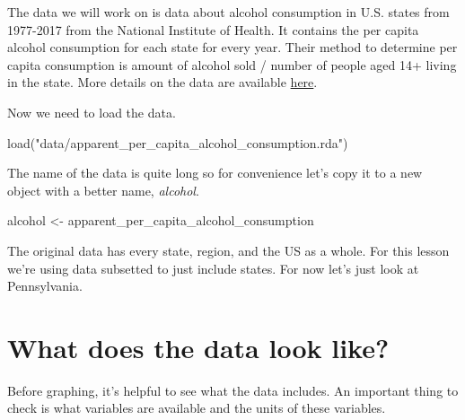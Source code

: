 \documentclass[
  12pt,
]{book}
\newenvironment{Shaded}{\begin{snugshade}}{\end{snugshade}}
\newcommand{\FunctionTok}[1]{\textcolor[rgb]{0,0,0}{#1}}
\newcommand{\NormalTok}[1]{#1}
\newcommand{\OtherTok}[1]{\textcolor[rgb]{0.37,0.37,0.37}{#1}}
\newcommand{\SpecialCharTok}[1]{\textcolor[rgb]{0,0,0}{#1}}
\newcommand{\StringTok}[1]{\textcolor[rgb]{0.5,0.5,0.5}{#1}}
\begin{document}
The data we will work on is data about alcohol consumption in U.S. states from 1977-2017 from the National Institute of Health. It contains the per capita alcohol consumption for each state for every year. Their method to determine per capita consumption is amount of alcohol sold / number of people aged 14+ living in the state. More details on the data are available \href{https://www.openicpsr.org/openicpsr/project/105583/version/V2/view}{here}.

Now we need to load the data.

\begin{Shaded}
\begin{Highlighting}[]
\FunctionTok{load}\NormalTok{(}\StringTok{"data/apparent\_per\_capita\_alcohol\_consumption.rda"}\NormalTok{)}
\end{Highlighting}
\end{Shaded}

The name of the data is quite long so for convenience let's copy it to a new object with a better name, \emph{alcohol}.

\begin{Shaded}
\begin{Highlighting}[]
\NormalTok{alcohol }\OtherTok{\textless{}{-}}\NormalTok{ apparent\_per\_capita\_alcohol\_consumption}
\end{Highlighting}
\end{Shaded}

The original data has every state, region, and the US as a whole. For this lesson we're using data subsetted to just include states. For now let's just look at Pennsylvania.

\begin{Shaded}
\end{Shaded}

\hypertarget{what-does-the-data-look-like}{%
\section{What does the data look like?}\label{what-does-the-data-look-like}}

Before graphing, it's helpful to see what the data includes. An important thing to check is what variables are available and the units of these variables.
\end{document}
